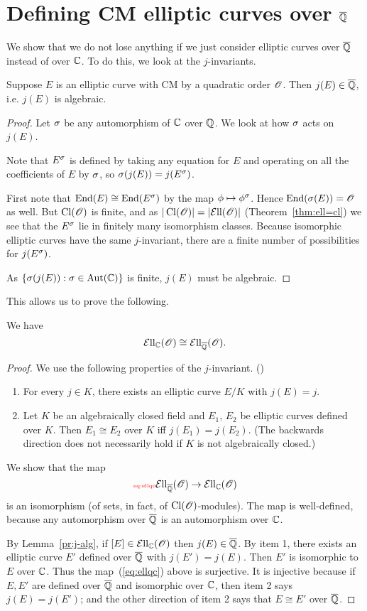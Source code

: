 \section{Defining CM elliptic curves over $\overline{\mathbb{Q}}$}
We show that we do not lose anything if we just consider elliptic curves over $\overline{\mathbb{Q}}$ instead of over $\mathbb{C}$. To do this, we look at the $j$-invariants.
\begin{pr}
Suppose $E$ is an elliptic curve with CM by a quadratic order $\mathscr{O}$.
Then $j(E)\in \overline{\mathbb{Q}}$, i.e. $j(E)$ is algebraic.
\end{pr}
\begin{proof}
Let $\sigma$ be any automorphism of $\mathbb{C}$ over $\mathbb{Q}$. We look at how $\sigma$ acts on $j(E)$.

Note that $E^{\sigma}$ is defined by taking any equation for $E$ and operating on all the coefficients of $E$ by $\sigma$, so $\sigma(j(E))=j(E^{\sigma})$.

First note that $ \operatorname{End}(E)\cong \operatorname{End}(E^{\sigma})$ by the map $\phi\mapsto \phi^{\sigma}$. Hence $\operatorname{End}(\sigma(E))=\mathscr{O}$ as well. But $\operatorname{Cl}(\mathscr{O})$ is finite, and as $|\operatorname{Cl}(\mathscr{O})|=|\mathcal{E}{\rm{ll}}(\mathscr{O})|$ (Theorem~\ref{thm:ell=cl}) we see that the $E^{\sigma}$ lie in finitely many isomorphism classes. Because isomorphic elliptic curves have the same $j$-invariant, there are a finite number of possibilities for $j(E^{\sigma})$.

As $\left\{{\sigma(j(E))}:{\sigma\in \operatorname{Aut}(\mathbb{C})}\right\}$ is finite, $j(E)$ must be algebraic.
\end{proof}
This allows us to prove the following.
\begin{thm}
We have
\[
\mathcal{E}{\rm{ll}}_{\mathbb{C}}(\mathscr{O})\cong \mathcal{E}{\rm{ll}}_{\overline{\mathbb{Q}}}(\mathscr{O}).
\]
\end{thm}
\begin{proof}
We use the following properties of the $j$-invariant. (\cite[III.1.4]{Si86})
\begin{enumerate}
\item
For every $j\in K$, there exists an elliptic curve $E/K$ with $j(E)=j$.
\item
Let $K$ be an algebraically closed field and $E_1$, $E_2$ be elliptic curves defined over $K$. Then $E_1\cong E_2$ over $K$ iff $j(E_1)=j(E_2)$. (The backwards direction does not necessarily hold if $K$ is not algebraically closed.)
\end{enumerate}
We show that the map
\begin{equation}\llabel{eq:ellqc}
\Ell_{\ol{\Q}}(\sO)\to \Ell_{\C}(\sO)
\end{equation}
is an isomorphism (of sets, in fact, of $\operatorname{Cl}(\mathscr{O})$-modules). The map is well-defined, because any automorphism over $\overline{\mathbb{Q}}$ is an automorphism over $\mathbb{C}$.

By Lemma~\ref{pr:j-alg}, if $[E]\in \mathcal{E}{\rm{ll}}_{\mathbb{C}}(\mathscr{O})$ then $j(E)\in \overline{\mathbb{Q}}$.
By item 1, there exists an elliptic curve $E'$ defined over $\overline{\mathbb{Q}}$ with $j(E')=j(E)$. Then $E'$ is isomorphic to $E$ over $\mathbb{C}$. Thus the map~(\ref{eq:ellqc}) above is surjective. It is injective because if $E,E'$ are defined over $\overline{\mathbb{Q}}$ and isomorphic over $\mathbb{C}$, then item 2 says $j(E)=j(E')$; and the other direction of item 2 says that $E\cong E'$ over $\overline{\mathbb{Q}}$.
\end{proof}
